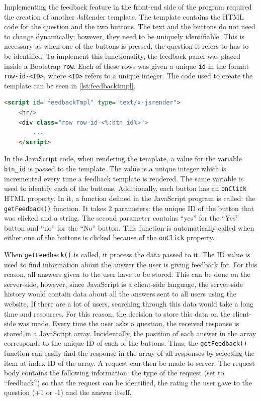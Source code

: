 \documentclass[12pt,a4paper]{article}
\newcommand{\captionstyle}[1] {
    \small{#1}
}
\begin{document}
Implementing the feedback feature in the front-end side of the program required the creation of another JsRender template. The template contains the HTML code for the question and the two buttons. The text and the buttons do not need to change dynamically; however, they need to be uniquely identifiable. This is necessary as when one of the buttons is pressed, the question it refers to has to be identified. To implement this functionality, the feedback panel was placed inside a Bootstrap \texttt{row}. Each of these rows was given a unique \texttt{id} in the format \texttt{row-id-<ID>}, where \texttt{<ID>} refers to a unique integer. The code used to create the template can be seen in \cref{lst:feedbacktmpl}. 

\begin{lstlisting}[language=html, caption={\captionstyle{The JsRender template used to generate HTML code for a feedback panel.}}, label={lst:feedbacktmpl}]
    <script id="feedbackTmpl" type="text/x-jsrender">
    <hr/>
    <div class="row row-id-<%:btn_id%>">
        ...
    </script>
    \end{lstlisting}

In the JavaScript code, when rendering the template, a value for the variable \texttt{btn\_id} is passed to the template. The value is a unique integer which is incremented every time a feedback template is rendered. The same variable is used to identify each of the buttons. Additionally, each button has an \texttt{onClick} HTML property. In it, a function defined in the JavaScript program is called: the \texttt{getFeedback()} function. It takes 2 parameters: the unique ID of the button that was clicked and a string. The second parameter contains “yes” for the “Yes” button and “no” for the “No” button. This function is automatically called when either one of the buttons is clicked because of the \texttt{onClick} property. 

When \texttt{getFeedback()} is called, it process the data passed to it. The ID value is used to find information about the answer the user is giving feedback for. For this reason, all answers given to the user have to be stored. This can be done on the server-side, however, since JavaScript is a client-side language, the server-side history would contain data about all the answers sent to all users using the website. If there are a lot of users, searching through this data would take a long time and resources. For this reason, the decision to store this data on the client-side was made. Every time the user asks a question, the received response is stored in a JavaScript array. Incidentally, the position of each answer in the array corresponds to the unique ID of each of the buttons. Thus, the \texttt{getFeedback()} function can easily find the response in the array of all responses by selecting the item at index ID of the array. A request can then be made to server. The request body contains the following information: the type of the request (set to “feedback”) so that the request can be identified, the rating the user gave to the question (+1 or -1) and the answer itself. 
\end{document}
